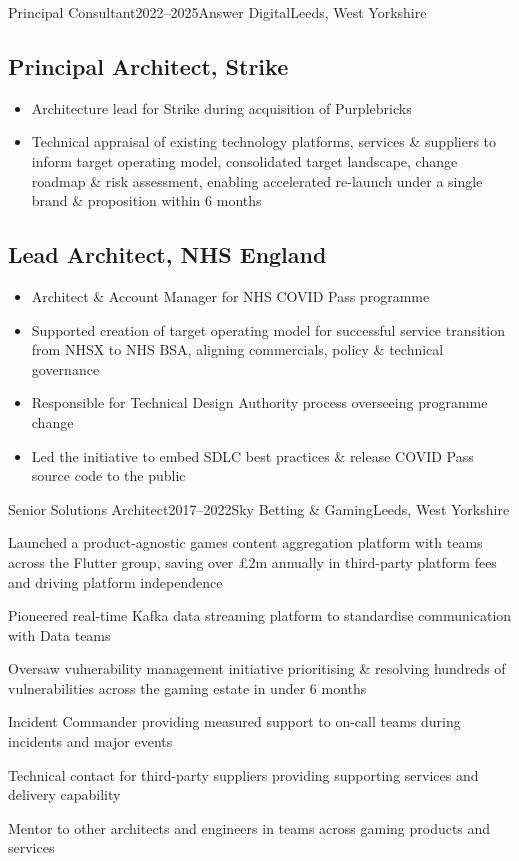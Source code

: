 \documentclass{cv}
\begin{document}
\begin{experienceplain}{Principal Consultant}{2022--2025}{Answer Digital}{Leeds, West Yorkshire}
\subsection{Principal Architect, Strike}
\begin{itemize}
\item Architecture lead for Strike during acquisition of Purplebricks
\item Technical appraisal of existing technology platforms, services \& suppliers to inform target
      operating model, consolidated target landscape, change roadmap \& risk assessment, enabling
      accelerated re-launch under a single brand \& proposition within 6 months
\end{itemize}

\subsection{Lead Architect, NHS England}
\begin{itemize}
\item Architect \& Account Manager for NHS COVID Pass programme
\item Supported creation of target operating model for successful service transition from NHSX to
      NHS BSA, aligning commercials, policy \& technical governance
\item Responsible for Technical Design Authority process overseeing programme change
\item Led the initiative to embed SDLC best practices \& release COVID Pass source code to
      the public
\end{itemize}
\end{experienceplain}


\begin{experience}{Senior Solutions Architect}{2017--2022}{Sky Betting \& Gaming}{Leeds, West Yorkshire}
\item Launched a product-agnostic games content aggregation platform with teams across the Flutter group,
      saving over £2m annually in third-party platform fees and driving platform independence
\item Pioneered real-time Kafka data streaming platform to standardise communication with Data teams
\item Oversaw vulnerability management initiative prioritising \& resolving hundreds of vulnerabilities
      across the gaming estate in under 6 months
\item Incident Commander providing measured support to on-call teams during incidents and major events
\item Technical contact for third-party suppliers providing supporting services and delivery capability
\item Mentor to other architects and engineers in teams across gaming products and services
\end{experience}
\end{document}
